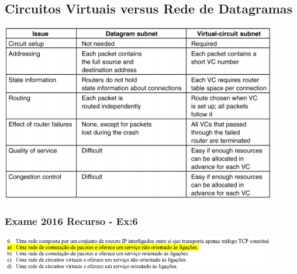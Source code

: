 \documentclass{article}
\begin{document}
\subsection{Circuitos Virtuais versus Rede de Datagramas}
\begin{center}            
    \includegraphics[width=12cm]{images/RCOM5.png}
\end{center}

\subsubsection{Exame 2016 Recurso - Ex:6}
\begin{center}            
    \includegraphics[width=12cm]{images/RCOM48.png}
\end{center}
\end{document}
